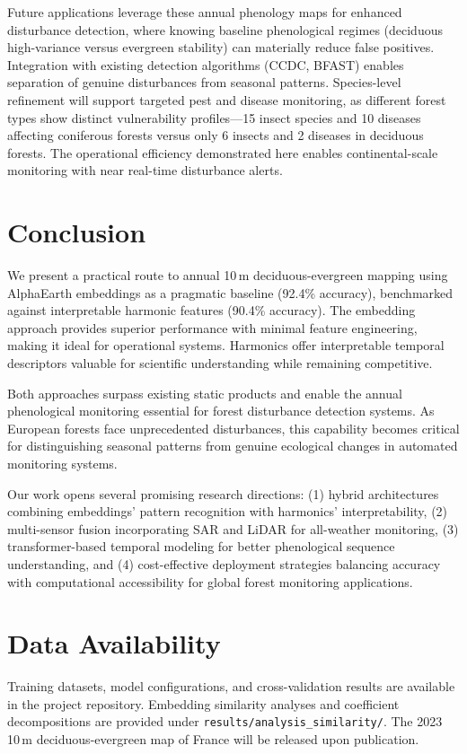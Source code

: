 \documentclass[utf8]{FrontiersinHarvard}
\begin{document}
Future applications leverage these annual phenology maps for enhanced disturbance detection, where knowing baseline phenological regimes (deciduous high-variance versus evergreen stability) can materially reduce false positives. Integration with existing detection algorithms (CCDC, BFAST) enables separation of genuine disturbances from seasonal patterns. Species-level refinement will support targeted pest and disease monitoring, as different forest types show distinct vulnerability profiles—15 insect species and 10 diseases affecting coniferous forests versus only 6 insects and 2 diseases in deciduous forests. The operational efficiency demonstrated here enables continental-scale monitoring with near real-time disturbance alerts.

\section{Conclusion}

We present a practical route to annual 10\,m deciduous-evergreen mapping using AlphaEarth embeddings as a pragmatic baseline (92.4\% accuracy), benchmarked against interpretable harmonic features (90.4\% accuracy). The embedding approach provides superior performance with minimal feature engineering, making it ideal for operational systems. Harmonics offer interpretable temporal descriptors valuable for scientific understanding while remaining competitive.

Both approaches surpass existing static products and enable the annual phenological monitoring essential for forest disturbance detection systems. As European forests face unprecedented disturbances, this capability becomes critical for distinguishing seasonal patterns from genuine ecological changes in automated monitoring systems.

Our work opens several promising research directions: (1) hybrid architectures combining embeddings' pattern recognition with harmonics' interpretability, (2) multi-sensor fusion incorporating SAR and LiDAR for all-weather monitoring, (3) transformer-based temporal modeling for better phenological sequence understanding, and (4) cost-effective deployment strategies balancing accuracy with computational accessibility for global forest monitoring applications.

\section*{Data Availability}
Training datasets, model configurations, and cross-validation results are available in the project repository. Embedding similarity analyses and coefficient decompositions are provided under \texttt{results/analysis\_similarity/}. The 2023 10\,m deciduous-evergreen map of France will be released upon publication.
\end{document}
